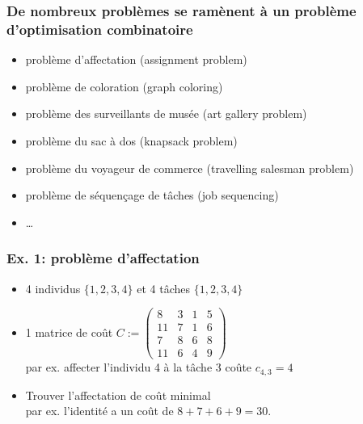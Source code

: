 \documentclass{beamer}
\begin{document}
\begin{frame}
  \frametitle{De nombreux problèmes se ramènent à un problème
    d'optimisation combinatoire}

  \begin{itemize}
    \item \alert{problème d'affectation (assignment problem)}
    \item \alert{problème de coloration (graph coloring)}
    \item problème des surveillants de musée (art gallery problem)
    \item problème du sac à dos (knapsack problem)
    \item problème du voyageur de commerce (travelling salesman problem)
    \item problème de séquençage de tâches (job sequencing)
    \item \dots
  \end{itemize}
  
\end{frame}

\begin{frame}
  \frametitle{Ex. 1: problème d'affectation}

  \begin{itemize}
  \item 4 individus $\{1,2,3,4\}$ et 4 tâches $\{1,2,3,4\}$
  \item 1 matrice de coût
    $C := \left(
    \begin{array}{cccc}
      8 & 3 & 1 & 5 \\
      11 & 7 & 1 & 6 \\
      7 & 8 & 6 & 8 \\
      11 & 6 & 4 & 9 
    \end{array}
    \right)$ \\
    par ex. affecter l'individu 4 à la tâche 3 coûte $c_{4,3} = 4$ 
  \item Trouver l'affectation de coût minimal \\
    par ex. l'identité a un coût de $8+7+6+9=30$. 
  \end{itemize}

\end{frame}
\end{document}
